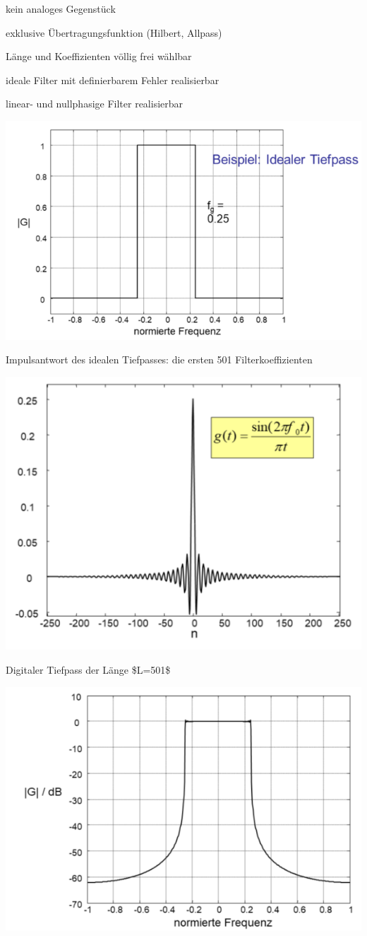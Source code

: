 \documentclass[a4paper]{article}
\begin{document}
\begin{multicols}{3}
  \begin{itemize*}
    \item kein analoges Gegenstück
    \item exklusive Übertragungsfunktion (Hilbert, Allpass)
    \item Länge und Koeffizienten völlig frei wählbar
    \item ideale Filter mit definierbarem Fehler realisierbar
    \item linear- und nullphasige Filter realisierbar
    \item \includegraphics[width=.5\linewidth]{Assets/Biosignalverarbeitung-fir-tiefpass.png}
    \item Impulsantwort des idealen Tiefpasses: die ersten 501 Filterkoeffizienten
    \begin{itemize*}
      \item \includegraphics[width=.5\linewidth]{Assets/Biosignalverarbeitung-fir-tiefpass-2.png}
    \end{itemize*}
    \item Digitaler Tiefpass der Länge \$L=501\$
    \begin{itemize*}
      \item \includegraphics[width=.5\linewidth]{Assets/Biosignalverarbeitung-fir-tiefpass-3.png}

\end{itemize*}
\end{itemize*}
\end{multicols}
\end{document}
